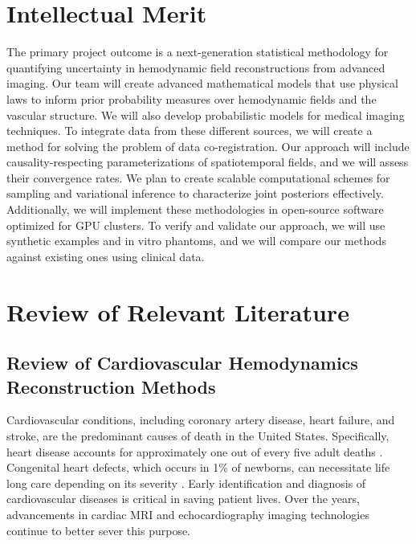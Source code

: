 \section{Intellectual Merit\label{sec:im}}

The primary project outcome is a next-generation statistical methodology for quantifying uncertainty in hemodynamic field reconstructions from advanced imaging. Our team will create advanced mathematical models that use physical laws to inform prior probability measures over hemodynamic fields and the vascular structure. We will also develop probabilistic models for medical imaging techniques. To integrate data from these different sources, we will create a method for solving the problem of data co-registration. Our approach will include causality-respecting parameterizations of spatiotemporal fields, and we will assess their convergence rates. We plan to create scalable computational schemes for sampling and variational inference to characterize joint posteriors effectively. Additionally, we will implement these methodologies in open-source software optimized for GPU clusters. To verify and validate our approach, we will use synthetic examples and in vitro phantoms, and we will compare our methods against existing ones using clinical data.

\section{Review of Relevant Literature\label{sec:review}}

\subsection{Review of Cardiovascular Hemodynamics Reconstruction Methods}


Cardiovascular conditions, including coronary artery disease, heart failure, and stroke, are the predominant causes of death in the United States. Specifically, heart disease accounts for approximately one out of every five adult deaths \cite{heartstat}. Congenital heart defects, which occurs in 1\% of newborns, can necessitate life long care depending on its severity \cite{CHDstat1}. Early identification and diagnosis of cardiovascular diseases is critical in saving patient lives. Over the years, advancements in cardiac MRI and echocardiography imaging technologies continue to better sever this purpose.

